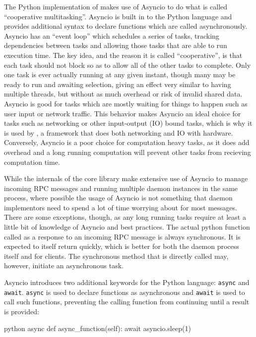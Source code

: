 The Python implementation of \yaq{} makes use of Asyncio\cite{} to do what is called ``cooperative multitasking''.
Asyncio is built in to the Python language and provides additional syntax to declare functions which are called asynchronously.
Asyncio has an ``event loop'' which schedules a series of tasks, tracking dependencies between tasks and allowing those tasks that are able to run execution time.
The key idea, and the reason it is called ``cooperative'', is that each task should not block so as to allow all of the other tasks to complete.
Only one task is ever actually running at any given instant, though many may be ready to run and awaiting selection, giving an effect very similar to having multiple threads, but without as much overhead or risk of invalid shared data.
Asyncio is good for tasks which are mostly waiting for things to happen such as user input or network traffic.
This behavior makes Asyncio an ideal choice for tasks such as networking or other input-output (IO) bound tasks, which is why it is used by \yaq{}, a framework that does both networking and IO with hardware.
Conversely, Asyncio is a poor choice for computation heavy tasks, as it does add overhead and a long running computation will prevent other tasks from recieving computation time.

While the internals of the core \yaq{} library make extensive use of Asyncio to manage incoming RPC messages and running multiple daemon instances in the same process, where possible the usage of Asyncio is not something that daemon implementors need to spend a lot of time worrying about for most messages.
There are some exceptions, though, as any long running tasks require at least a little bit of knowledge of Asyncio and best practices.
The actual python function called as a response to an incoming RPC message is always synchronous.
It is expected to itself return quickly, which is better for both the daemon process itself and for clients.
The synchronous method that is directly called may, however, initiate an asynchronous task.

Asyncio introduces two additional keywords for the Python language: \texttt{async} and \texttt{await}.
\texttt{async} is used to declare functions as asynchronous and \texttt{await} is used to call such functions, preventing the calling function from continuing until a result is provided:

\begin{codefragment}{python}
    async def async_function(self):
        await asyncio.sleep(1)
\end{codefragment}

